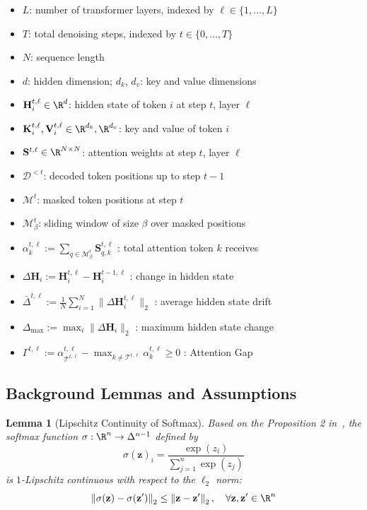 \documentclass{article} %
\newtheorem{lemma}[theorem]{Lemma}
\theoremstyle{definition}
\theoremstyle{remark}
\newcommand{\norm}[1]{\left\|#1\right\|}
\begin{document}
\begin{itemize}
\item $L$: number of transformer layers, indexed by $\ell \in \{1,\ldots,L\}$
\item $T$: total denoising steps, indexed by $t \in \{0,\ldots,T\}$
\item $N$: sequence length
\item $d$: hidden dimension; $d_k$, $d_v$: key and value dimensions
\item $\mathbf{H}^{t,\ell}_i \in \R^{d}$: hidden state of token $i$ at step $t$, layer $\ell$
\item $\mathbf{K}^{t,\ell}_i, \mathbf{V}^{t,\ell}_i \in \R^{d_k}, \R^{d_v}$: key and value of token $i$
\item $\mathbf{S}^{t,\ell} \in \R^{N \times N}$: attention weights at step $t$, layer $\ell$
\item $\mathcal{D}^{<t}$: decoded token positions up to step $t-1$
\item $\mathcal{M}^t$: masked token positions at step $t$
\item $\mathcal{M}^t_\beta$: sliding window of size $\beta$ over masked positions

\item $\alpha^{t,\ell}_k := \sum_{q \in \mathcal{M}^t_\beta} \mathbf{S}^{t,\ell}_{q,k}$ : total attention token $k$ receives
\item $\Delta\mathbf{H}_i := \mathbf{H}^{t,\ell}_i - \mathbf{H}^{t-1,\ell}_i$ : change in hidden state

\item $\bar{\Delta}^{t,\ell} := \frac{1}{N}\sum_{i=1}^N \|\Delta\mathbf{H}^{t,\ell}_i\|_2$ : average hidden state drift

\item $\Delta_{\max} := \max_{i} \|\Delta\mathbf{H}_i\|_2$ : maximum hidden state change

\item $\Gamma^{t,\ell} := \alpha^{t,\ell}_{\mathcal{T}^{t,\ell}} - \max_{k \neq \mathcal{T}^{t,\ell}} \alpha^{t,\ell}_k \geq 0$ : Attention Gap

\end{itemize}

\subsection{Background Lemmas and Assumptions}

\begin{lemma}[Lipschitz Continuity of Softmax]
\label{lem:softmax-lip}
Based on the Proposition 2 in~\cite{gao2017properties}, the softmax function $\sigma: \R^n \to \Delta^{n-1}$ defined by
\begin{equation}
\sigma(\mathbf{z})_i = \frac{\exp(z_i)}{\sum_{j=1}^n \exp(z_j)}
\end{equation}
is $1$-Lipschitz continuous with respect to the $\ell_2$ norm:
\begin{equation}
\norm{\sigma(\mathbf{z}) - \sigma(\mathbf{z}')}_2 \leq \norm{\mathbf{z} - \mathbf{z}'}_2, \quad \forall \mathbf{z}, \mathbf{z}' \in \R^n
\end{equation}
\end{lemma}
\end{document}
